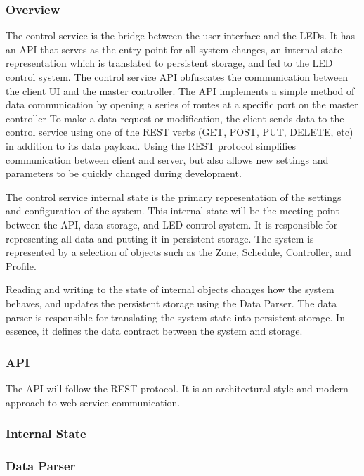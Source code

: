 \documentclass[onecolumn, draftclsnofoot,10pt, compsoc]{IEEEtran}
\begin{document}
			\subsubsection{Overview}
			The control service is the bridge between the user interface and the LEDs.
			It has an API that serves as the entry point for all system changes, an internal state representation which is translated to persistent storage, and fed to the LED control system.
			The control service API obfuscates the communication between the client UI and the master controller.
			The API implements a simple method of data communication by opening a series of routes at a specific port on the master controller
			To make a data request or modification, the client sends data to the control service using one of the REST verbs (GET, POST, PUT, DELETE, etc) in addition to its data payload.
			Using the REST protocol simplifies communication between client and server, but also allows new settings and parameters to be quickly changed during development.

			The control service internal state is the primary representation of the settings and configuration of the system.
			This internal state will be the meeting point between the API, data storage, and LED control system.
			It is responsible for representing all data and putting it in persistent storage.
			The system is represented by a selection of objects such as the Zone, Schedule, Controller, and Profile.

			Reading and writing to the state of internal objects changes how the system behaves, and updates the persistent storage using the Data Parser.
			The data parser is responsible for translating the system state into persistent storage.
			In essence, it defines the data contract between the system and storage.

			\subsubsection{API}
			The API will follow the REST protocol. It is an architectural style and modern approach to web service communication. \cite[ch.5]{rest1}
			\subsubsection{Internal State}
			\subsubsection{Data Parser}
\end{document}
